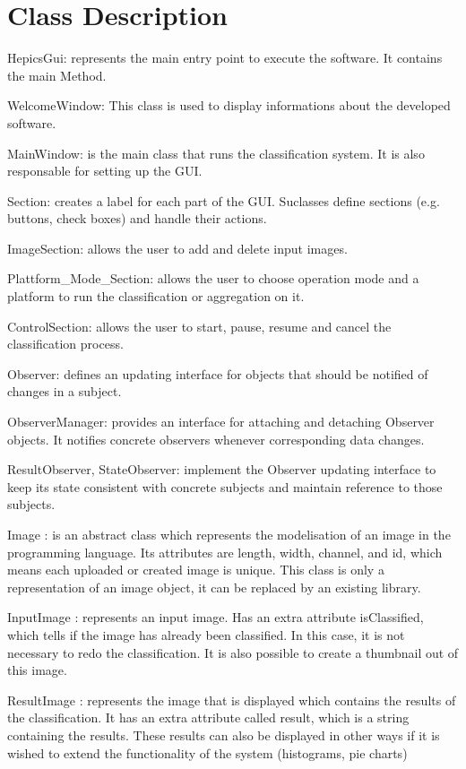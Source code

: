 \documentclass[parskip=full]{scrartcl}
\begin{document}
\pagebreak

\section {Class Description}

HepicsGui: represents the main entry point to execute the software. It contains the main Method.

WelcomeWindow: This class is used to display informations about the developed software.

MainWindow: is the main class that runs the classification system. It is also responsable for setting up the GUI.

Section: creates a label for each part of the GUI. Suclasses define sections (e.g. buttons, check boxes) and handle their actions.

ImageSection: allows the user to add and delete input images.

Plattform\_Mode\_Section: allows the user to choose operation mode and a platform to run the classification or aggregation on it.

ControlSection: allows the user to start, pause, resume and cancel the classification process.

Observer: defines an updating interface for objects that should be notified of changes in a subject.

ObserverManager: provides an interface for attaching and detaching Observer objects. It notifies concrete observers whenever corresponding data changes.

ResultObserver, StateObserver: implement the Observer updating interface to keep its state consistent with concrete subjects and maintain reference to those subjects.




Image : is an abstract class which represents the modelisation of an image in the programming language. Its attributes are length, width, channel, and id, which means each uploaded or created image is unique. This class is only a representation of an image object, it can be replaced by an existing library.

InputImage : represents an input image. Has an extra attribute isClassified, which tells if the image has already been classified. In this case, it is not necessary to redo the classification. It is also possible to create a thumbnail out of this image.

ResultImage : represents the image that is displayed which contains the results of the classification. It has an extra attribute called result, which is a string containing the results. These results can also be displayed in other ways if it is wished to extend the functionality of the system (histograms, pie charts)
\end{document}
